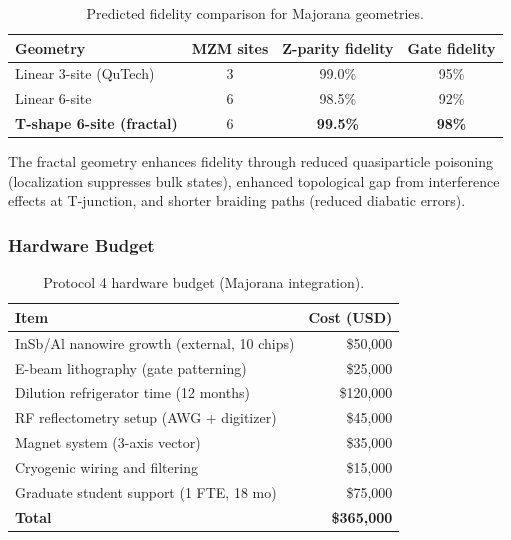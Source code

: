 \begin{table}[h]
\caption{Predicted fidelity comparison for Majorana geometries.}
\label{tab:majorana_predictions}
\begin{ruledtabular}
\begin{tabular}{lccc}
\textbf{Geometry} & \textbf{MZM sites} & \textbf{Z-parity fidelity} & \textbf{Gate fidelity} \\
\hline
Linear 3-site (QuTech) & 3 & 99.0\% & 95\% \\
Linear 6-site & 6 & 98.5\% & 92\% \\
\textbf{T-shape 6-site (fractal)} & 6 & \textbf{99.5\%} & \textbf{98\%} \\
\end{tabular}
\end{ruledtabular}
\end{table}

The fractal geometry enhances fidelity through reduced quasiparticle poisoning (localization suppresses bulk states), enhanced topological gap from interference effects at T-junction, and shorter braiding paths (reduced diabatic errors).

\subsubsection{Hardware Budget}

\begin{table}[h]
\caption{Protocol 4 hardware budget (Majorana integration).}
\label{tab:budget_p4}
\begin{ruledtabular}
\begin{tabular}{lr}
\textbf{Item} & \textbf{Cost (USD)} \\
\hline
InSb/Al nanowire growth (external, 10 chips) & \$50,000 \\
E-beam lithography (gate patterning) & \$25,000 \\
Dilution refrigerator time (12 months) & \$120,000 \\
RF reflectometry setup (AWG + digitizer) & \$45,000 \\
Magnet system (3-axis vector) & \$35,000 \\
Cryogenic wiring and filtering & \$15,000 \\
Graduate student support (1 FTE, 18 mo) & \$75,000 \\
\hline
\textbf{Total} & \textbf{\$365,000} \\
\end{tabular}
\end{ruledtabular}
\end{table}

